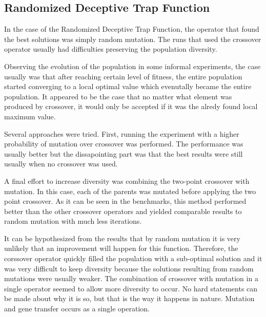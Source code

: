 \documentclass[10pt]{article}
\begin{document}
\subsection{Randomized Deceptive Trap Function}

In the case of the Randomized Deceptive Trap Function, the operator that found the best solutions was simply random mutation. The runs that used the crossover operator usually had difficulties preserving the population diversity.

Observing the evolution of the population in some informal experiments, the case usually was that after reaching certain level of fitness, the entire population started converging to a local optimal value which evenutally became the entire population. It appeared to be the case that no matter what element was produced by crossover, it would only be accepted if it was the alredy found local maximum value.

Several approaches were tried. First, running the experiment with a higher probability of mutation over crossover was performed. The performance was usually better but the dissapointing part was that the best results were still usually when no crossover was used.

A final effort to increase diversity was combining the two-point crossover with mutation. In this case, each of the parents was mutated before applying the two point crossover. As it can be seen in the benchmarks, this method performed better than the other crossover operators and yielded comparable results to random mutation with much less iterations.

It can be hypothesized from the results that by random mutation it is very unlikely that an improvement will happen for this function. Therefore, the corssover operator quickly filled the population with a sub-optimal solution and it was very difficult to keep diversity because the solutions resulting from random mutations were usually weaker. The combination of crossover with mutation in a single operator seemed to allow more diversity to occur. No hard statements can be made about why it is so, but that is the way it happens in nature. Mutation and gene transfer occurs as a single operation.
\end{document}
